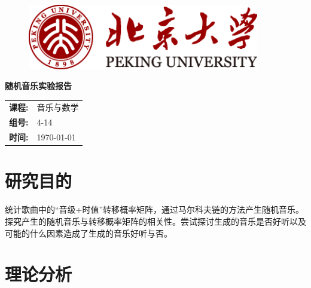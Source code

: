 \documentclass[12pt, a4paper, oneside]{ctexart}
\begin{document}
	
	\thispagestyle{empty}
	
	\begin{figure}
		\centering
		\includegraphics[width = 0.9\textwidth]{logo}
	\end{figure}
	\vspace*{\fill}
	\begin{center}
		\Huge\textbf{随机音乐实验报告}
	\end{center}
	\vspace*{\fill}
	
	\begin{table}[b]
		\centering
		\large
		\begin{tabular}{ll}
			\textbf{课程:} & 音乐与数学 \\
			\textbf{组号:} & 4-14\\
			\textbf{时间:} & \today\\
		\end{tabular}
	\end{table}
	
	
	\newpage
	\setcounter{page}{1}
	\tableofcontents
	\newpage
	\setcounter{page}{1}
	
	\section{研究目的}
	统计歌曲中的“音级+时值”转移概率矩阵，通过马尔科夫链的方法产生随机音乐。
	探究产生的随机音乐与转移概率矩阵的相关性。尝试探讨生成的音乐是否好听以及可能的什么因素造成了生成的音乐好听与否。
	
	\section{理论分析}
\end{document}

